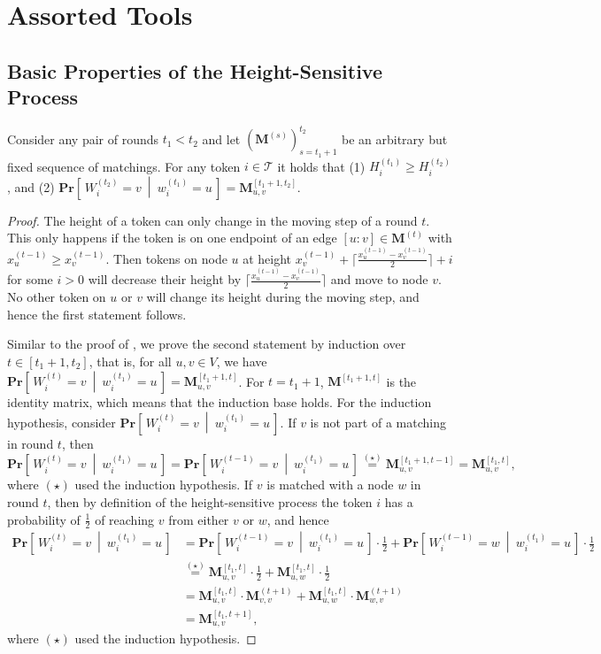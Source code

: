 \documentclass[twoside,leqno]{article}
\newcommand{\Proco}[2]{\mathbf{Pr} \left[\,#1~\middle\vert~#2\,\right]}
\newcommand{\M}{\mathbf{M}}
\DeclareMathOperator{\1}{\mathbf{1}}
\numberwithin{equation}{section}
\begin{document}
\section{Assorted Tools}

\subsection{Basic Properties of the Height-Sensitive Process}

\begin{lemma}
\label{lem:OneTokenRW}
Consider any pair of rounds $t_1 < t_2$ and let $(\M^{(s)} )_{s=t_1+1}^{t_2}$ be an arbitrary but fixed sequence of matchings. For any token $i\in \mathcal{T}$ it holds that (1) $H_i^{(t_1)} \geq H_i^{(t_2)}$, and (2)
$
\Proco{W_i^{(t_2)}=v}{w_i^{(t_1)}=u} = 
\M_{u,v}^{[t_1+1,t_2]}.
$
\end{lemma}
\begin{proof}
    The height of a token can only change in the moving step of a round $t$. This only happens if the token is on one endpoint of an edge $[u:v] \in \M^{(t)}$ with $x_{u}^{(t-1)} \ge x_{v}^{(t-1)}$. Then tokens on node $u$ at height $x_{v}^{(t-1)}+\lceil \frac{x_{u}^{(t-1)} - x_{v}^{(t-1)}}{2}\rceil +i$ for some $i>0$ will decrease their height by $\lceil \frac{x_{u}^{(t-1)} - x_{v}^{(t-1)}}{2}\rceil$ and move to node $v$. No other token on $u$ or $v$ will change its height during the moving step, and hence the first statement follows.

    Similar to the proof of \cite[Lemma~4.1]{DBLP:conf/focs/SauerwaldS12}, we prove the second statement by induction over $t \in [t_1+1,t_2]$, that is, for all $u, v \in V$, we have
    $\Proco{W_i^{(t)}=v}{w_i^{(t_1)}=u} = \M_{u,v}^{[t_1+1,t]}$. For $t=t_1+1$, $\M^{[t_1+1,t]}$ is the identity matrix, which means that the induction base holds. For the induction hypothesis, consider $\Proco{W_i^{(t)}=v}{w_i^{(t_1)}=u}$. If $v$ is not part of a matching in round $t$, then 
    \[
    \Proco{W_i^{(t)}=v}{w_i^{(t_1)}=u} = \Proco{W_i^{(t-1)}=v}{w_i^{(t_1)}=u} \stackrel{(\star)}{=} \M_{u,v}^{[t_1+1,t-1]}= \M_{u,v}^{[t_1,t]},
    \]
    where $(\star)$ used the induction hypothesis.
    If $v$ is matched with a node $w$ in round $t$, then by definition of the height-sensitive process the token $i$ has a probability of $\frac{1}{2}$ of reaching $v$ from either $v$ or $w$, and hence
    \begin{align*}
         \Proco{W_i^{(t)}=v}{w_i^{(t_1)}=u} &= 
        \Proco{W_i^{(t-1)}=v}{w_i^{(t_1)}=u} \cdot \frac{1}{2}
         +  \Proco{W_i^{(t-1)}=w}{w_i^{(t_1)}=u} \cdot \frac{1}{2} \\
         &\stackrel{(\star)}{=} 
         \M_{u,v}^{[t_1,t]} \cdot \frac{1}{2}
         + \M_{u,w}^{[t_1,t]} \cdot \frac{1}{2} \\
         &= \M_{u,v}^{[t_1,t]} \cdot \M_{v,v}^{(t+1)}
         + \M_{u,w}^{[t_1,t]} \cdot \M_{w,v}^{(t+1)} \\
         &= \M_{u,v}^{[t_1,t+1]},
    \end{align*}
 where $(\star)$ used the induction hypothesis.
\end{proof}
\end{document}
